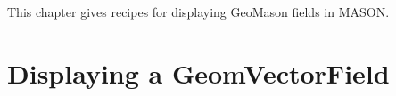 \documentclass[twoside,10pt]{book}
\newcommand\code[1]{\textsf{#1}}
\begin{document}
This chapter gives recipes for displaying GeoMason fields in MASON.



\section{Displaying a \code{GeomVectorField}}
\label{sec:displayingGeomVectorField}
\end{document}
